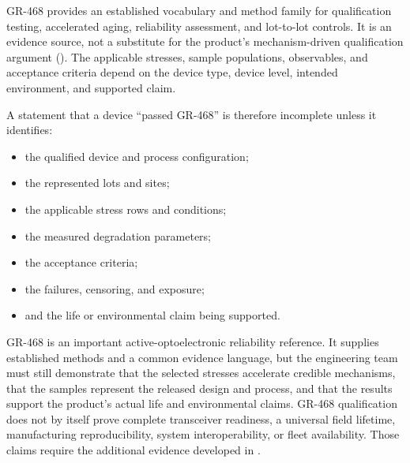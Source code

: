 GR-468 provides an established vocabulary and method family for qualification
testing, accelerated aging, reliability assessment, and lot-to-lot controls. It
is an evidence source, not a substitute for the product's mechanism-driven
qualification argument (). The
applicable stresses, sample populations, observables, and acceptance criteria
depend on the device type, device level, intended environment, and supported
claim.

A statement that a device ``passed GR-468'' is therefore incomplete unless it
identifies:
\begin{itemize}
\item the qualified device and process configuration;
\item the represented lots and sites;
\item the applicable stress rows and conditions;
\item the measured degradation parameters;
\item the acceptance criteria;
\item the failures, censoring, and exposure;
\item and the life or environmental claim being supported.
\end{itemize}

GR-468 is an important active-optoelectronic reliability reference. It supplies
established methods and a common evidence language, but the engineering team
must still demonstrate that the selected stresses accelerate credible
mechanisms, that the samples represent the released design and process, and
that the results support the product's actual life and environmental claims.
GR-468 qualification does not by itself prove complete transceiver readiness, a
universal field lifetime, manufacturing reproducibility, system
interoperability, or fleet availability. Those claims require the additional
evidence developed in .

